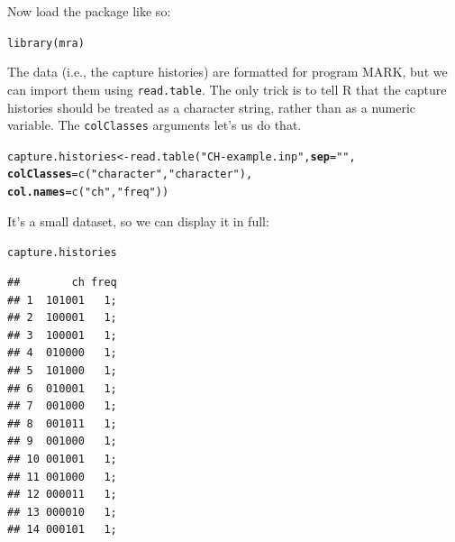 \documentclass[12pt]{article}\usepackage[]{graphicx}\usepackage[]{color}
\makeatletter
\newcommand{\hlstr}[1]{\textcolor[rgb]{0.749,0.012,0.012}{#1}}%
\newcommand{\hlstd}[1]{\textcolor[rgb]{0,0,0}{#1}}%
\newcommand{\hlkwb}[1]{\textcolor[rgb]{0,0.341,0.682}{#1}}%
\newcommand{\hlkwc}[1]{\textcolor[rgb]{0,0,0}{\textbf{#1}}}%
\newcommand{\hlkwd}[1]{\textcolor[rgb]{0.004,0.004,0.506}{#1}}%
\newenvironment{kframe}{%
 \def\at@end@of@kframe{}%
 \ifinner\ifhmode%
  \def\at@end@of@kframe{\end{minipage}}%
  \begin{minipage}{\columnwidth}%
 \fi\fi%
 \def\FrameCommand##1{\hskip\@totalleftmargin \hskip-\fboxsep
 \colorbox{shadecolor}{##1}\hskip-\fboxsep
     \hskip-\linewidth \hskip-\@totalleftmargin \hskip\columnwidth}%
 \MakeFramed {\advance\hsize-\width
   \@totalleftmargin\z@ \linewidth\hsize
   \@setminipage}}%
 {\par\unskip\endMakeFramed%
 \at@end@of@kframe}
\newenvironment{knitrout}{}{} %
\newcommand{\inr}[1]{\colorbox{inlinecolor}{\texttt{#1}}}
\makeatother
\begin{document}
Now load the package like so: 

\begin{knitrout}
\color{fgcolor}\begin{kframe}
\begin{alltt}
\hlkwd{library}\hlstd{(mra)}
\end{alltt}
\end{kframe}
\end{knitrout}

The data (i.e., the capture histories) are formatted for program MARK,
but we can import them using 
\inr{read.table}. The only trick is to tell R that the capture
histories should be treated as a character string, rather than as a
numeric variable. The \inr{colClasses} arguments let's us do that.

\begin{knitrout}
\color{fgcolor}\begin{kframe}
\begin{alltt}
\hlstd{capture.histories} \hlkwb{<-} \hlkwd{read.table}\hlstd{(}\hlstr{"CH-example.inp"}\hlstd{,} \hlkwc{sep}\hlstd{=}\hlstr{" "}\hlstd{,}
                                \hlkwc{colClasses}\hlstd{=}\hlkwd{c}\hlstd{(}\hlstr{"character"}\hlstd{,} \hlstr{"character"}\hlstd{),}
                                \hlkwc{col.names}\hlstd{=}\hlkwd{c}\hlstd{(}\hlstr{"ch"}\hlstd{,} \hlstr{"freq"}\hlstd{))}
\end{alltt}
\end{kframe}
\end{knitrout}

It's a small dataset, so we can display it in full:

\begin{knitrout}
\color{fgcolor}\begin{kframe}
\begin{alltt}
\hlstd{capture.histories}
\end{alltt}
\begin{verbatim}
##        ch freq
## 1  101001   1;
## 2  100001   1;
## 3  100001   1;
## 4  010000   1;
## 5  101000   1;
## 6  010001   1;
## 7  001000   1;
## 8  001011   1;
## 9  001000   1;
## 10 001001   1;
## 11 001000   1;
## 12 000011   1;
## 13 000010   1;
## 14 000101   1;
\end{verbatim}
\end{kframe}
\end{knitrout}
\end{document}
